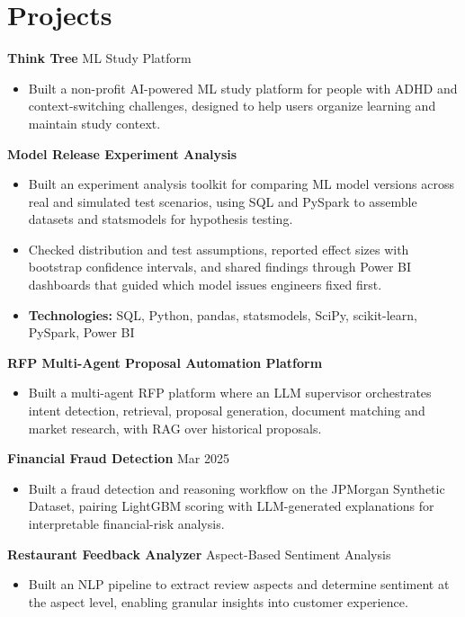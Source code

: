 \documentclass[10pt,a4paper]{article}
\begin{document}
\section{Projects}
\textbf{Think Tree} \textbar{} ML Study Platform\par
\begin{itemize}
  \item Built a non-profit AI-powered ML study platform for people with ADHD and context-switching challenges, designed to help users organize learning and maintain study context.
\end{itemize}
\textbf{Model Release Experiment Analysis}\par
\begin{itemize}
  \item Built an experiment analysis toolkit for comparing ML model versions across real and simulated test scenarios, using SQL and PySpark to assemble datasets and statsmodels for hypothesis testing.
  \item Checked distribution and test assumptions, reported effect sizes with bootstrap confidence intervals, and shared findings through Power BI dashboards that guided which model issues engineers fixed first.
  \item \textbf{Technologies:} SQL, Python, pandas, statsmodels, SciPy, scikit-learn, PySpark, Power BI
\end{itemize}
\textbf{RFP Multi-Agent Proposal Automation Platform}\par
\begin{itemize}
  \item Built a multi-agent RFP platform where an LLM supervisor orchestrates intent detection, retrieval, proposal generation, document matching and market research, with RAG over historical proposals.
\end{itemize}
\textbf{Financial Fraud Detection} \textbar{} Mar 2025\par
\begin{itemize}
  \item Built a fraud detection and reasoning workflow on the JPMorgan Synthetic Dataset, pairing LightGBM scoring with LLM-generated explanations for interpretable financial-risk analysis.
\end{itemize}
\textbf{Restaurant Feedback Analyzer} \textbar{} Aspect-Based Sentiment Analysis\par
\begin{itemize}
  \item Built an NLP pipeline to extract review aspects and determine sentiment at the aspect level, enabling granular insights into customer experience.
\end{itemize}
\end{document}

